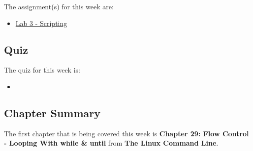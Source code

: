The assignment(s) for this week are:

\begin{itemize}
    \item \href{https://github.com/QuantumCompiler/CU/tree/main/CSPB%203308%20-%20Software%20Development%20Methods%20And%20Tools/Assignments/Assignment%203%20-%20Scripting}{Lab 3 - Scripting}
\end{itemize}

\subsection{Quiz}

The quiz for this week is:

\begin{itemize}
    \item {}
\end{itemize}

\newpage

\subsection{Chapter Summary}

The first chapter that is being covered this week is \textbf{Chapter 29: Flow Control - Looping With while \& until} from \textbf{The Linux Command Line}.

